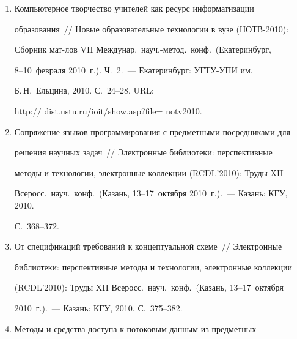 \begin{enumerate}[1.]
Междунар.\ науч.-метод.\ конф.\ (Екатеринбург, 8--10~февраля 2010~г.). 


Ч.~2.~--- Екатеринбург: УГТУ-УПИ им.\ Б.\,Н.~Ельцина, 2010. С.~20--24. 


URL: {\sf http://dist.ustu.ru/ioit/show.asp?file=notv2010}.


\item {}


Компьютерное творчество учителей как ресурс информатизации 


образования~/\!\!/  Новые образовательные технологии в вузе (НОТВ-2010): 


Сборник мат-лов VII Междунар.\ науч.-метод.\ конф.\ (Екатеринбург, 


8--10~февраля 2010~г.). Ч.~2.~--- Екатеринбург: УГТУ-УПИ им.\ 


Б.\,Н.~Ельцина, 2010. С.~24--28.  URL: 


{\sf http:// dist.ustu.ru/ioit/show.asp?file= notv2010}.


\item {}


Сопряжение языков программирования с предметными посредниками для 


решения научных задач~/\!\!/  Электронные библиотеки: перспективные 


методы и технологии, электронные коллекции (RCDL'2010): Труды XII 


Всеросс.\ науч.\ конф.\ (Казань, 13--17~октября 2010~г.).~--- Казань: КГУ, 2010. 


С.~368--372.


\item {}


От спецификаций требований к концептуальной схеме~/\!\!/  Электронные 


библиотеки: перспективные методы и технологии, электронные коллекции 


(RCDL'2010): Труды XII Всеросс.\ науч.\ конф.\ (Казань, 13--17~октября 


2010~г.).~--- Казань: КГУ, 2010. С.~375--382.


\item {}


Методы и средства доступа к потоковым данным из предметных 



\end{enumerate}
